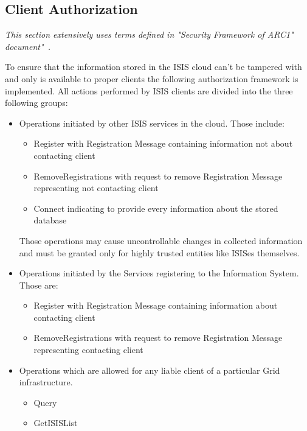 \documentclass{book}
\begin{document}
\subsection{Client Authorization}
\label{sub:isis_authorization_client_authorization}


\textit{This section extensively uses terms defined in "Security Framework of ARC1" document"~\cite{arcsec}.}

To ensure that the information stored in the ISIS cloud can't be tampered with and only is available to proper clients the following authorization framework is implemented. All actions performed by ISIS clients are divided into the three following groups:

\begin{itemize}
 \item Operations initiated by other ISIS services in the cloud. Those include:
 \begin{itemize}
  \item Register with Registration Message containing information not about contacting client
  \item RemoveRegistrations with request to remove Registration Message representing not contacting client
  \item Connect indicating to provide every information about the stored database
 \end{itemize}

 Those operations may cause uncontrollable changes in collected information and must be granted only for highly trusted entities like ISISes themselves.

 \item Operations initiated by the Services registering to the Information System. Those are:
 \begin{itemize}
  \item Register with Registration Message containing information about contacting client
  \item RemoveRegistrations with request to remove Registration Message representing contacting client
 \end{itemize}

 \item Operations which are allowed for any liable client of a particular Grid infrastructure.
 \begin{itemize}
  \item Query
  \item GetISISList
 \end{itemize}
\end{itemize}
\end{document}
